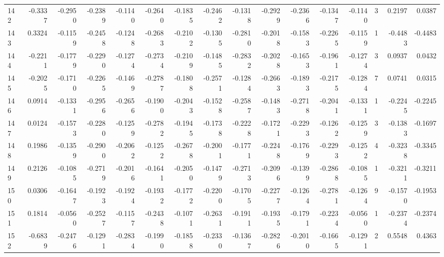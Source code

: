 \begin{tabular}{lrrrrrrrrrrrrrrr}
142 &     -0.3337 & -0.2950 & -0.2389 & -0.1140 & -0.2640 & -0.1835 & -0.2462 & -0.1318 & -0.2929 & -0.2366 &  -0.1347 &    -0.1140 &      3 &                    0.2197 &                     0.0387 \\
143 &      0.3324 & -0.1159 & -0.2458 & -0.1248 & -0.2683 & -0.2102 & -0.1305 & -0.2810 & -0.2018 & -0.1583 &  -0.2265 &    -0.1159 &      1 &                   -0.4483 &                    -0.4483 \\
144 &     -0.2211 & -0.1779 & -0.2290 & -0.1274 & -0.2734 & -0.2109 & -0.1485 & -0.2832 & -0.2028 & -0.1653 &  -0.1961 &    -0.1274 &      3 &                    0.0937 &                     0.0432 \\
145 &     -0.2025 & -0.1710 & -0.2265 & -0.1469 & -0.2787 & -0.1808 & -0.2571 & -0.1284 & -0.2663 & -0.1893 &  -0.2175 &    -0.1284 &      7 &                    0.0741 &                     0.0315 \\
146 &      0.0914 & -0.1331 & -0.2956 & -0.2656 & -0.1900 & -0.2043 & -0.1528 & -0.2587 & -0.1483 & -0.2718 &  -0.2041 &    -0.1331 &      1 &                   -0.2245 &                    -0.2245 \\
147 &      0.0124 & -0.1573 & -0.2280 & -0.1259 & -0.2782 & -0.1945 & -0.1738 & -0.2228 & -0.1721 & -0.2293 &  -0.1262 &    -0.1259 &      3 &                   -0.1383 &                    -0.1697 \\
148 &      0.1986 & -0.1359 & -0.2900 & -0.2062 & -0.1252 & -0.2678 & -0.2001 & -0.1771 & -0.2248 & -0.1769 &  -0.2293 &    -0.1252 &      4 &                   -0.3238 &                    -0.3345 \\
149 &      0.2126 & -0.1085 & -0.2719 & -0.2016 & -0.1641 & -0.2050 & -0.1479 & -0.2713 & -0.2096 & -0.1399 &  -0.2868 &    -0.1085 &      1 &                   -0.3211 &                    -0.3211 \\
150 &      0.0306 & -0.1647 & -0.1923 & -0.1924 & -0.1932 & -0.1772 & -0.2200 & -0.1705 & -0.2277 & -0.1264 &  -0.2781 &    -0.1264 &      9 &                   -0.1570 &                    -0.1953 \\
151 &      0.1814 & -0.0560 & -0.2527 & -0.1157 & -0.2438 & -0.1071 & -0.2631 & -0.1911 & -0.1935 & -0.1791 &  -0.2234 &    -0.0560 &      1 &                   -0.2374 &                    -0.2374 \\
152 &     -0.6839 & -0.2476 & -0.1291 & -0.2834 & -0.1990 & -0.1858 & -0.2330 & -0.1367 & -0.2826 & -0.2010 &  -0.1665 &    -0.1291 &      2 &                    0.5548 &                     0.4363 \\

\end{tabular}
